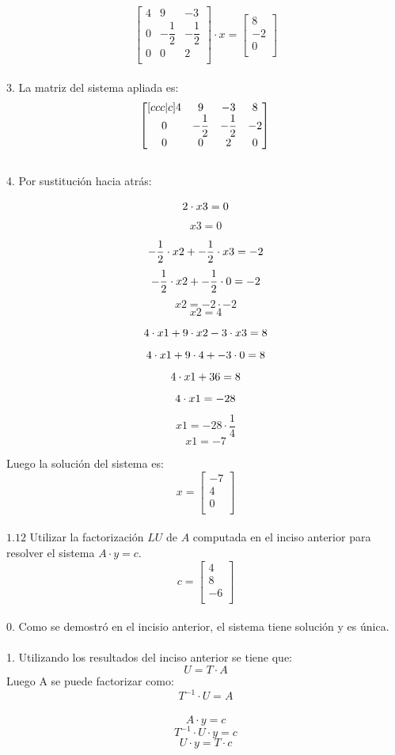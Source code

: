 \documentclass{article}
\begin{document}
\[ 
\begin{bmatrix}
4 & 9 & -3 \\
0 & -\dfrac{1}{2} & -\dfrac{1}{2} \\
0 & 0 & 2 \\
\end{bmatrix}
\cdot x = 
\begin{bmatrix}
8 \\
-2 \\
0 \\
\end{bmatrix}
\]\\
3. La matriz del sistema apliada es:
\[ 
\begin{bmatrix}[ccc|c]
  4 & 9 & -3 & 8\\
  0 & -\dfrac{1}{2} & -\dfrac{1}{2} & -2\\
  0 & 0 & 2 & 0
\end{bmatrix}\\
\]\\

4. Por sustitución hacia atrás:

\[
2 \cdot x3 = 0 \\
\]
\[
x3=0
\]

\[
-\dfrac{1}{2} \cdot x2 + -\dfrac{1}{2} \cdot x3 = -2 \\
\]
\[
-\dfrac{1}{2} \cdot x2 + -\dfrac{1}{2} \cdot 0 = -2 \\
\]
\[
x2 = -2 \cdot -2
\]
\[
x2 = 4  
\]

\[
4 \cdot x1 + 9 \cdot x2 - 3 \cdot x3 = 8 \\
\]
\[
4 \cdot x1 + 9 \cdot 4 + - 3 \cdot 0 = 8 \\
\]
\[
4 \cdot x1 + 36 = 8 \\
\]
\[
4 \cdot x1 = -28 \\
\]
\[
x1 = -28 \cdot \dfrac{1}{4}
\]
\[
x1 = -7
\]

Luego la solución del sistema es:
\[
    x =
    \begin{bmatrix}
    -7 \\
    4 \\
    0 \\
    \end{bmatrix}
\]\\

$1.12$ Utilizar la factorización $LU$ de $A$ computada en el inciso anterior para resolver el sistema $A \cdot y = c$.
\[
c=\begin{bmatrix}
4 \\
8 \\
-6 \\
\end{bmatrix}
\]\\
0. Como se demostró en el incisio anterior, el sistema tiene solución y es única. \\\\
1. Utilizando los resultados del inciso anterior se tiene que:\\
\[
U = T \cdot A
\]
Luego A se puede factorizar como:
\[
T^{-1} \cdot U = A
\]
\\
\[
A \cdot y = c
\]
\[
T^{-1} \cdot U \cdot y = c 
\]
\[
U \cdot y = T \cdot c
\]
\end{document}
